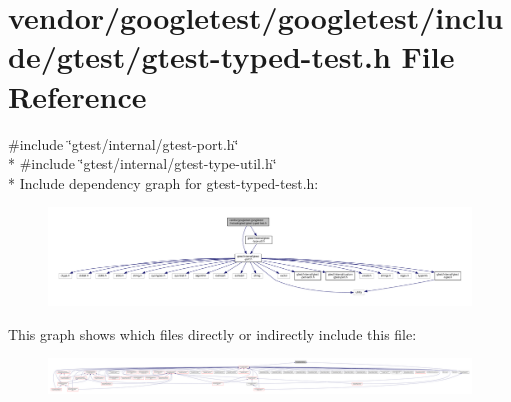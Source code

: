 \hypertarget{gtest-typed-test_8h}{}\section{vendor/googletest/googletest/include/gtest/gtest-\/typed-\/test.h File Reference}
\label{gtest-typed-test_8h}
{\ttfamily \#include \char`\"{}gtest/internal/gtest-\/port.\+h\char`\"{}}\\*
{\ttfamily \#include \char`\"{}gtest/internal/gtest-\/type-\/util.\+h\char`\"{}}\\*
Include dependency graph for gtest-\/typed-\/test.h\+:
\nopagebreak
\begin{figure}[H]
\begin{center}
\leavevmode
\includegraphics[width=350pt]{gtest-typed-test_8h__incl}
\end{center}
\end{figure}
This graph shows which files directly or indirectly include this file\+:
\nopagebreak
\begin{figure}[H]
\begin{center}
\leavevmode
\includegraphics[width=350pt]{gtest-typed-test_8h__dep__incl}
\end{center}
\end{figure}
